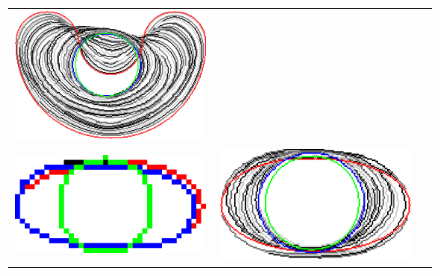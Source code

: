 \begin{figure}[hp!]
\begin{tabular}{ccc}
	\includegraphics[scale=0.25]{figures/chapter5/flow/bean/radius_5/ii/elastica/len_pen_0.01000/jonctions_1/best/gs_0.25000/summary.pdf}\\[2em]			

	
	\includegraphics[scale=0.25]{figures/chapter5/flow/ellipse/radius_5/ii/elastica/len_pen_0.01000/jonctions_1/best/gs_1.00000/summary.pdf} &

	\includegraphics[scale=0.25]{figures/chapter5/flow/ellipse/radius_5/ii/elastica/len_pen_0.01000/jonctions_1/best/gs_0.25000/summary.pdf} &


\end{tabular}
\end{figure}
